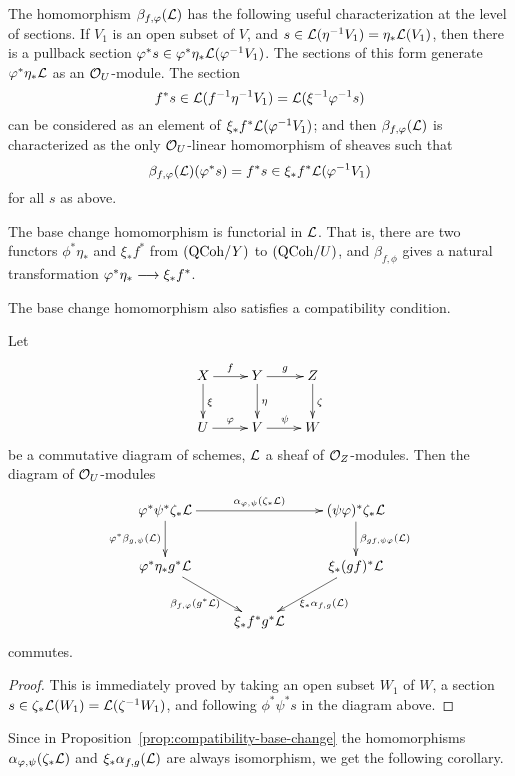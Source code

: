 \begin{4   STACKS}
\begin{4.3 Descent for morphisms of schemes}
The homomorphism $\beta_{f, \varphi}(\mathcal{L})$ has the following useful characterization at the level of sections. If $V_{1}$ is an open subset of $V$, and $s \in \mathcal{L}(\eta^{-1}V_{1}) = \eta_{*}\mathcal{L}(V_{1})$, then there is a pullback section $\varphi^{*}s \in \varphi^{*}\eta_{*}\mathcal{L}(\varphi^{-1}V_{1})$. The sections of this form generate $\varphi^{*}\eta_{*}\mathcal{L}$ as an $\mathcal{O}_{U}$-module. The section
   \[
   f^{*}s \in \mathcal{L}(f^{-1}\eta^{-1}V_{1}) = \mathcal{L}(\xi^{-1}\varphi^{-1}s)
   \]
can be considered as an element of $\xi_{*}f^{*}\mathcal{L}(\varphi^{-1}V_{1})$; and then $\beta_{f,\varphi}(\mathcal{L})$ is characterized as the only $\mathcal{O}_{U}$-linear homomorphism of sheaves such that
   \[
   \beta_{f,\varphi}(\mathcal{L})(\varphi^{*}s) = f^{*}s \in
      \xi_{*}f^{*}\mathcal{L}(\varphi^{-1}V_{1})
   \]
for all $s$ as above.

The base change homomorphism is functorial in $\mathcal{L}$. That is, there are two functors $\phi^*\eta_*$ and $\xi_* f ^*$ from $({\mathrm{QCoh}/Y})$ to $({\mathrm{QCoh}/U})$, and $\beta_{f, \phi}$ gives a natural transformation $\phi^*\eta_* \arr \xi_* f^*$. 

The base change homomorphism also satisfies a compatibility condition.

\begin{proposition}\label{prop:compatibility-base-change}
Let
   \[
   \xymatrix{
   X \ar[r]^f \ar[d]^\xi & Y \ar[r]^g \ar[d]^\eta & Z \ar[d]^\zeta \\
   U \ar[r]^\phi         & V \ar[r]^\psi           & W
   }
   \]
be a commutative diagram of schemes, $\mathcal{L}$ a sheaf of $\mathcal{O}_{Z}$-modules. Then the diagram of $\mathcal{O}_U$-modules
   \[
   \xymatrix{
   {}\phi^*\psi^*\zeta_*\cL
   \ar[rr]^-{\isoass_{\phi, \psi}(\zeta_*\cL)} 
   \ar[d]_{\phi^* \beta_{g, \psi}(\cL)}&&
   {} (\psi\phi)^*\zeta_* \cL
   \ar[d]^{\beta_{gf, \psi\phi}(\cL)}\\
   {}\phi^*\eta_*g^* \cL \ar[rd]_{\beta_{f, \phi}(g^*\cL)}&&
   {}\xi_*(gf)^* \cL\ar[ld]^{\xi_*\isoass_{f,g}(\cL)}\\
   & {}\xi_*f^*g^* \cL
   }
   \]
commutes.
\end{proposition}

\begin{proof}
This is immediately proved by taking an open subset $W_{1}$ of $W$, a section $s \in \zeta_{*}\mathcal{L}(W_{1}) = \mathcal{L}(\zeta^{-1}W_{1})$, and following $\phi^{*}\psi^{*}s$ in the diagram above.
\end{proof}

Since in Proposition~\ref{prop:compatibility-base-change} the homomorphisms $\alpha_{\varphi, \psi}(\zeta_*\mathcal{L})$ and $\xi_*\alpha_{f,g}(\mathcal{L})$ are always isomorphism, we get the following corollary.


\end{4.3 Descent for morphisms of schemes}
\end{4   STACKS}
